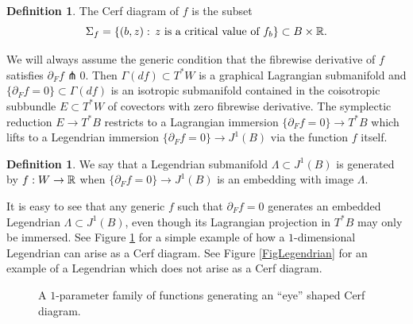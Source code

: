 \documentclass[11pt]{article}
\newcommand{\smaller}{\small}
\numberwithin{equation}{section}\providecommand{\dpl}{\displaystyle}
\theoremstyle{plain}
\theoremstyle{definition}
\newtheorem{definition}[theorem]{Definition}
\begin{document}
\begin{definition}
The Cerf diagram of $f$ is the subset
\[
\Sigma_f=\{ (b,z) : \, \text{$z$ is a critical value of $f_b$} \} \subset B \times \mathbb{R}.
\]
\end{definition}

We will always assume the generic condition that the fibrewise derivative of $f$ satisfies $\partial_F f \pitchfork 0 $. Then $\Gamma(df) \subset T^*W$ is a graphical Lagrangian submanifold and $ \{ \partial_F f = 0 \} \subset \Gamma(df)$ is an isotropic submanifold contained in the coisotropic subbundle $E \subset T^*W$ of covectors with zero fibrewise derivative. The symplectic reduction $E \to T^*B$ restricts to a Lagrangian immersion $\{ \partial_F f= 0 \} \to T^*B$ which lifts to a Legendrian immersion $\{ \partial_Ff = 0 \} \to J^1(B)$ via the function $f$ itself.

\begin{definition} We say that a Legendrian submanifold $\Lambda \subset J^1(B)$ is generated by $f:W \to \mathbb{R}$ when $\{ \partial_F f = 0 \} \to J^1 (B)$ is an embedding with image $\Lambda$.
\end{definition}

It is easy to see that any generic $f$ such that $\partial_F f = 0$ generates an embedded Legendrian $\Lambda \subset J^1(B)$, even though its Lagrangian projection in $T^*B$ may only be immersed. See Figure \ref{Fig: simple Legendrian} for a simple example of how a $1$-dimensional Legendrian can arise as a Cerf diagram. See Figure \ref{FigLegendrian} for an example of a Legendrian which does not arise as a Cerf diagram.
\begin{figure}[htbp]
\begin{center}
\caption{\smaller A $1$-parameter family of functions generating an ``eye'' shaped Cerf diagram.}
\label{Fig: simple Legendrian}
\end{center}
\end{figure}
\end{document}
